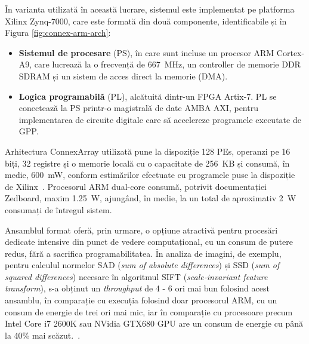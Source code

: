 În varianta utilizată în această lucrare, sistemul este implementat pe platforma
Xilinx Zynq-7000, care este formată din două componente, identificabile și în
Figura \ref{fig:connex-arm-arch}:
\begin{itemize}
  \item \textbf{Sistemul de procesare} (PS), în care sunt incluse un procesor ARM
  Cortex-A9, care lucrează la o frecvență de \SI{667}{MHz}, un controller de memorie
  DDR SDRAM și un sistem de acces direct la memorie (DMA).    

  \item \textbf{Logica programabilă} (PL), alcătuită dintr-un FPGA Artix-7. PL
  se conectează la PS printr-o magistrală de date AMBA AXI, pentru implementarea
  de circuite digitale care să accelereze programele executate de GPP.
\end{itemize}

Arhitectura ConnexArray utilizată pune la dispoziție 128 PEs, operanzi pe 16
biți, 32 registre și o memorie locală cu o capacitate de \SI{256}{KB} și consumă, în
medie, \SI{600}{mW}, conform estimărilor efectuate cu programele puse la dispoziție de
Xilinx~\cite{fpga-visual}. Procesorul ARM dual-core consumă, potrivit
documentației Zedboard, maxim \SI{1.25}{W}, ajungând, în medie, la
un total de aproximativ \SI{2}{W} consumați de întregul sistem. \\


Ansamblul format oferă, prin urmare, o opțiune atractivă pentru procesări
dedicate intensive din punct de vedere computațional, cu un consum de putere
redus, fără a sacrifica programabilitatea. În analiza de imagini, de exemplu,
pentru calculul normelor SAD (\textit{sum of absolute differences}) și SSD
(\textit{sum of squared differences}) necesare în algoritmul SIFT
(\textit{scale-invariant feature transform}), s-a obținut un \textit{throughput}
de 4 - 6 ori mai bun folosind acest ansamblu, în comparație cu execuția folosind
doar procesorul ARM, cu un consum de energie de trei ori mai mic, iar în
comparație cu procesoare precum Intel Core i7 2600K sau NVidia GTX680 GPU are un
consum de energie cu până la 40\% mai scăzut.~\cite{fpga-visual}.

